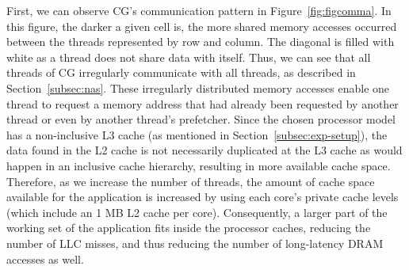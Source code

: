 \documentclass[AMA,final,STIX1COL]{WileyNJD-v2}
\newcommand{\vsg}[1]{\textcolor{blue}{\bfseries \ul{vsgirelli: #1} }\vspace{0.2cm}}
\newcommand{\fbm}[1]{\textcolor{red}{\bfseries \ul{fbm: #1} }\vspace{0.2cm}}
\begin{document}
First, we can observe CG's communication pattern in Figure~\ref{fig:figcomma}.
In this figure, the darker a given cell is, the more shared memory accesses occurred between the threads represented by row and column.
The diagonal is filled with white as a thread does not share data with itself.
Thus, we can see that all threads of CG irregularly communicate with all threads, as described in Section~\ref{subsec:nas}.
These irregularly distributed memory accesses enable one thread to request a memory address that had already been requested by another thread or even by another thread's prefetcher.
Since the chosen processor model has a non-inclusive L3 cache (as mentioned in Section~\ref{subsec:exp-setup}), the data found in the L2 cache is not necessarily duplicated at the L3 cache as would happen in an inclusive cache hierarchy, resulting in more available cache space.
Therefore, as we increase the number of threads, the amount of cache space available for the application is increased by using each core's private cache levels (which include an 1 MB L2 cache per core).
Consequently, a larger part of the working set of the application fits inside the processor caches, reducing the number of LLC misses, and thus reducing the number of long-latency DRAM accesses as well. 
\end{document}
